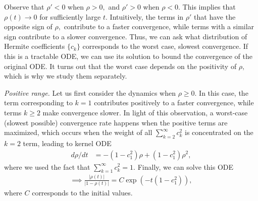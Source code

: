 \documentclass[twoside]{article}
\theoremstyle{definition}
\newcommand{\thomas}[1]{{\color{blue}\textit{#1}}}
\begin{document}
Observe that $\rho'<0$ when $\rho>0,$ and $\rho'>0$ when $\rho<0.$ This implies that $\rho(t) \to 0$ for sufficiently large $t.$ Intuitively, the terms in $\rho'$ that have the opposite sign of $\rho,$ contribute to a faster convergence, while terms with a similar sign contribute to a slower convergence. Thus, we can ask what distribution of Hermite coefficients $\{c_k\}$ corresponds to the worst case, slowest convergence. If this is a tractable ODE, we can use its solution to bound the convergence of the original ODE. It turns out that the worst case depends on the positivity of $\rho,$ which is why we study them separately.

\textit{Positive range.}
Let us first consider the dynamics when $\rho\ge 0.$ 
In this case, the term corresponding to $k=1$ contributes positively to a faster convergence, while terms $k\ge 2$ make convergence slower. In light of this observation, a worst-case (slowest possible) convergence rate happens when the positive terms are maximized, which occurs when the weight of all $\sum_{k=2}^\infty c_k^2 $ is concentrated on the $k=2$ term, leading to kernel ODE
\begin{align*}
    d\rho/dt &=  -(1-c_1^2)\rho + (1-c_1^2) \rho^2,
\end{align*}
where we used the fact that $\sum_{k=1}^\infty c_k^2 = 1.$ 
Finally, we can solve this ODE 
\begin{align*}
     \implies \frac{|\rho(t)|}{|1-\rho(t)|} = C \exp(-t(1-c_1^2)),
\end{align*}
where $C$ corresponds to the initial values. 
\end{document}
